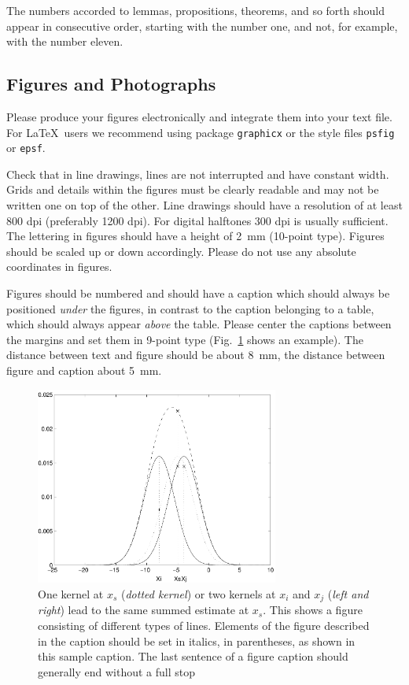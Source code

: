 \documentclass[runningheads]{llncs}
\begin{document}
The numbers accorded to lemmas, propositions, theorems, and so forth should
appear in consecutive order, starting with the number one, and not, for
example, with the number eleven.

\subsection{Figures and Photographs}
\label{sect:figures}

Please produce your figures electronically and integrate
them into your text file. For \LaTeX\ users we recommend using package
\verb+graphicx+ or the style files \verb+psfig+ or \verb+epsf+.

Check that in line drawings, lines are not
interrupted and have constant width. Grids and details within the
figures must be clearly readable and may not be written one on top of
the other. Line drawings should have a resolution of at least 800 dpi
(preferably 1200 dpi).
For digital halftones 300 dpi is usually sufficient.
The lettering in figures should have a height of 2~mm (10-point type).
Figures should be scaled up or down accordingly.
Please do not use any absolute coordinates in figures.

Figures should be numbered and should have a caption which should
always be positioned {\it under} the figures, in contrast to the caption
belonging to a table, which should always appear {\it above} the table.
Please center the captions between the margins and set them in
9-point type
(Fig.~\ref{fig:example} shows an example).
The distance between text and figure should be about 8~mm, the
distance between figure and caption about 5~mm.
\begin{figure}
	\centering
	\includegraphics[height=6.5cm]{eijkel2}
	\caption{One kernel at $x_s$ ({\it dotted kernel}) or two kernels at
		$x_i$ and $x_j$ ({\it left and right}) lead to the same summed estimate
		at $x_s$. This shows a figure consisting of different types of
		lines. Elements of the figure described in the caption should be set in
		italics,
		in parentheses, as shown in this sample caption. The last
		sentence of a figure caption should generally end without a full stop}
	\label{fig:example}
\end{figure}
\end{document}
